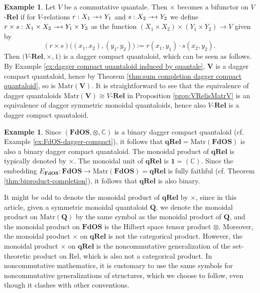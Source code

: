 \documentclass[12pt]{tac}
\theoremstyle{definition}
\newtheorem{example}[theorem]{Example}
\theoremstyle{remark}
\newcommand{\CC}{\mathbb C}
\newcommand{\<}{\langle}
\renewcommand{\>}{\rangle}
\renewcommand{\:}{\colon}
\newcommand{\Rel}{\mathrm{Rel}}
\newcommand{\qRel}{\mathbf{qRel}}
\def\sto{\relbar\joinrel\mapstochar\joinrel\rightarrow}
\begin{document}
\begin{example}\label{ex:V-Rel is dagger compact quantaloid}
Let $V$ be a commutative quantale. Then $\times$ becomes a bifunctor on $V$-$\mathbf{Rel}$ if for $V$-relations $r:X_1\sto Y_1$ and $s:X_2\sto Y_2$ we define $r\times s:X_1\times X_2\sto Y_1\times Y_2$ as the function $(X_1\times X_2)\times (Y_1\times Y_2)\to V$ given by \[(r\times s)\big( (x_1,x_2),(y_1,y_2)\big):=r(x_1,y_1)\cdot s(x_2,y_2).\] Then $(V$-$\mathbf{Rel},\times, 1)$ is a dagger compact quantaloid, which can be seen as follows. By Example \ref{ex:dagger compact quantaloid induced by quantale}, $\mathbf V$ is a dagger compact quantaloid, hence by Theorem \ref{thm:sum completion dagger compact quantaloid}, so is $\mathrm{Matr}(\mathbf V)$. It is straightforward to see that the equivalence of dagger quantaloids $\mathrm{Matr}(\mathbf V)\cong V$-$\mathbf{Rel}$ in Proposition \ref{prop:VRelisMatrV} is an equivalence of dagger symmetric monoidal quantaloids, hence also $V$-$\mathbf{Rel}$ is a dagger compact quantaloid. 
\end{example}

\begin{example}\label{ex:qRel-dagger-compact}
    Since $(\mathbf{FdOS},\otimes,\CC)$ is a binary dagger compact quantaloid (cf.
    Example \ref{ex:FdOS-dagger-compact}), it follows that
    $\mathbf{qRel}=\mathrm{Matr}(\mathbf{FdOS})$ is also a binary dagger compact
    quantaloid. The monoidal product of $\qRel$ is typically denoted by $\times$. The
    monoidal unit of $\mathbf{qRel}$ is $\mathbf 1=(\CC)$. Since the embedding
    $E_{\mathbf{FdOS}}:\mathbf{FdOS}\to\mathrm{Matr}(\mathbf{FdOS})=\mathbf{qRel}$ is
    fully faithful (cf. Theorem \ref{thm:biproduct-completion}), it follows that
    $\mathbf{qRel}$ is also binary.
\end{example}
 It might be odd to denote the monoidal product of $\qRel$ by $\times$, since in this article, given a symmetric monoidal quantaloid $\mathbf Q$, we denote the monoidal product on $\mathrm{Matr}(\mathbf Q)$ by the same symbol as the monoidal product of $\mathbf Q$, and the monoidal product on $\mathbf{FdOS}$ is the Hilbert space tensor product $\otimes$. Moreover, the monoidal product $\times$ on $\qRel$ is not the categorical product. However, the monoidal product $\times$ on $\qRel$ is the noncommutative generalization of the set-theoretic product on $\Rel$, which is also not a categorical product. In noncommutative mathematics, it is customary to use the same symbols for noncommutative generalizations of structures, which we choose to follow, even though it clashes with other conventions. 
\end{document}
